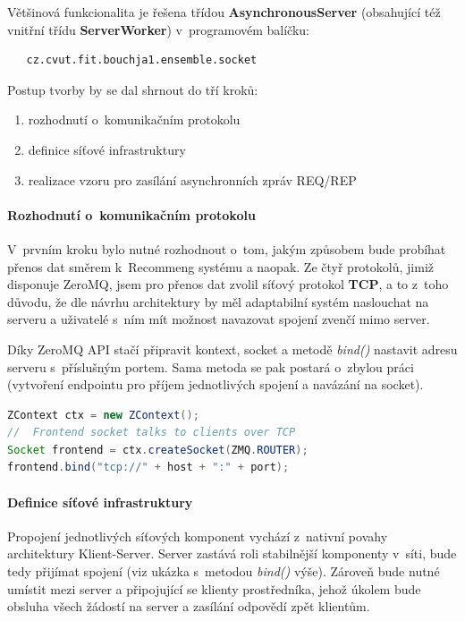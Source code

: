 \documentclass[thesis=M,czech]{FITthesis}[2014/05/07]
\begin{document}
Většinová funkcionalita je řešena třídou \textbf{AsynchronousServer} (obsahující též vnitřní třídu \textbf{ServerWorker}) v~programovém balíčku:

\begin{verbatim}
   cz.cvut.fit.bouchja1.ensemble.socket
\end{verbatim}

Postup tvorby by se dal shrnout do tří kroků:

\begin{enumerate}
	\item rozhodnutí o~komunikačním protokolu
	\item definice síťové infrastruktury
	\item realizace vzoru pro zasílání asynchronních zpráv REQ/REP
\end{enumerate}

\paragraph{Rozhodnutí o~komunikačním protokolu}
\label{subsub:kompr}
V~prvním kroku bylo nutné rozhodnout o~tom, jakým způsobem bude probíhat přenos dat směrem k~Recommeng systému a naopak. Ze čtyř protokolů, jimiž disponuje ZeroMQ, jsem pro přenos dat zvolil síťový protokol \textbf{TCP}, a to z~toho důvodu, že dle návrhu architektury by měl adaptabilní systém naslouchat na serveru a uživatelé s~ním mít možnost navazovat spojení zvenčí mimo server.

Díky ZeroMQ API stačí připravit kontext, socket a metodě \emph{bind()} nastavit adresu serveru s~příslušným portem. Sama metoda se pak postará o~zbylou práci (vytvoření endpointu pro příjem jednotlivých spojení a navázání na socket).

\begin{lstlisting}[language=java]
ZContext ctx = new ZContext();
//  Frontend socket talks to clients over TCP
Socket frontend = ctx.createSocket(ZMQ.ROUTER);
frontend.bind("tcp://" + host + ":" + port);
\end{lstlisting}

\paragraph{Definice síťové infrastruktury}
\label{subsub:queue}
Propojení jednotlivých síťových komponent vychází z~nativní povahy architektury Klient-Server. Server zastává roli stabilnější komponenty v~síti, bude tedy přijímat spojení (viz ukázka s~metodou \emph{bind()} výše). Zároveň bude nutné umístit mezi server a připojující se klienty prostředníka, jehož úkolem bude obsluha všech žádostí na server a zasílání odpovědí zpět klientům.
\end{document}
